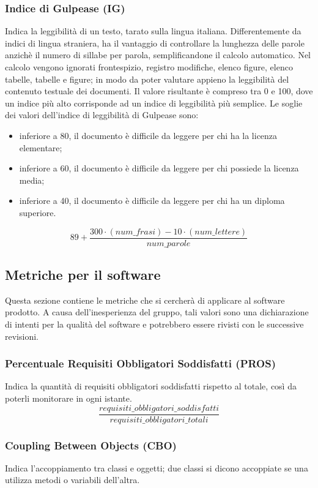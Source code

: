 \subsubsection{Indice di Gulpease (IG)}
Indica la leggibilità di un testo, tarato sulla lingua italiana. Differentemente da indici di lingua straniera, ha il vantaggio di controllare la lunghezza delle parole anzichè il numero di sillabe per parola, semplificandone il calcolo automatico. 
Nel calcolo vengono ignorati frontespizio, registro modifiche, elenco figure, elenco tabelle, tabelle e figure; in modo da poter valutare appieno la leggibilità del contenuto testuale dei documenti.
Il valore risultante è compreso tra 0 e 100, dove un indice più alto corrisponde ad un indice di leggibilità più semplice.
Le soglie dei valori dell’indice di leggibilità di Gulpease sono:
\begin{itemize}
    \item inferiore a 80, il documento è difficile da leggere per chi ha la licenza elementare;
    \item inferiore a 60, il documento è difficile da leggere per chi possiede la licenza media;
    \item inferiore a 40, il documento è difficile da leggere per chi ha un diploma superiore.
\end{itemize}
\[
    89+ \frac{300\cdot (num\_frasi) - 10\cdot (num\_lettere)}{num\_parole}
\]

\subsection{Metriche per il software}
Questa sezione contiene le metriche che si cercherà di applicare al software prodotto. A causa dell’inesperienza del gruppo, tali valori sono una dichiarazione di intenti per la qualità del software e potrebbero essere rivisti con le successive revisioni.

\subsubsection{Percentuale Requisiti Obbligatori Soddisfatti (PROS)}
Indica la quantità di requisiti obbligatori soddisfatti rispetto al totale, così da poterli monitorare in ogni istante.
\[\frac{requisiti\_obbligatori\_soddisfatti}{requisiti\_obbligatori\_totali}\]

\subsubsection{Coupling Between Objects (CBO)}
Indica l'accoppiamento tra classi e oggetti; due classi si dicono accoppiate se una utilizza metodi o variabili dell'altra.

